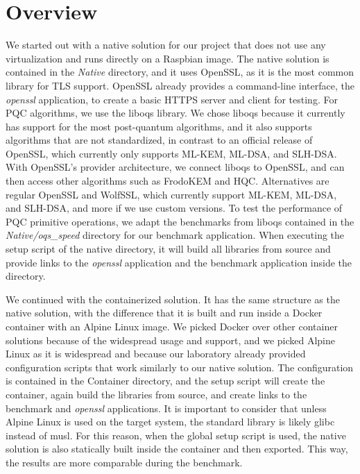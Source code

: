 \documentclass[public,noindent]{aisecreport}
\begin{document}
\section{Overview}

We started out with a native solution for our project that does not use any virtualization and runs directly on a Raspbian image. The native solution is contained in the \textit{Native} directory, and it uses OpenSSL, as it is the most common library for TLS support. OpenSSL already provides a command-line interface, the \textit{openssl} application, to create a basic HTTPS server and client for testing. For PQC algorithms, we use the liboqs library. We chose liboqs because it currently has support for the most post-quantum algorithms, and it also supports algorithms that are not standardized, in contrast to an official release of OpenSSL, which currently only supports ML-KEM, ML-DSA, and SLH-DSA. With OpenSSL's provider architecture, we connect liboqs to OpenSSL, and can then access other algorithms such as FrodoKEM and HQC. Alternatives are regular OpenSSL and WolfSSL, which currently support ML-KEM, ML-DSA, and SLH-DSA, and more if we use custom versions. To test the performance of PQC primitive operations, we adapt the benchmarks from liboqs contained in the \textit{Native/oqs\_speed} directory for our benchmark application. When executing the setup script of the native directory, it will build all libraries from source and provide links to the \textit{openssl} application and the benchmark application inside the directory.

We continued with the containerized solution. It has the same structure as the native solution, with the difference that it is built and run inside a Docker container with an Alpine Linux image. We picked Docker over other container solutions because of the widespread usage and support, and we picked Alpine Linux as it is widespread and because our laboratory already provided configuration scripts that work similarly to our native solution. The configuration is contained in the Container directory, and the setup script will create the container, again build the libraries from source, and create links to the benchmark and \textit{openssl} applications. It is important to consider that unless Alpine Linux is used on the target system, the standard library is likely glibc instead of musl. For this reason, when the global setup script is used, the native solution is also statically built inside the container and then exported. This way, the results are more comparable during the benchmark. 
\end{document}
